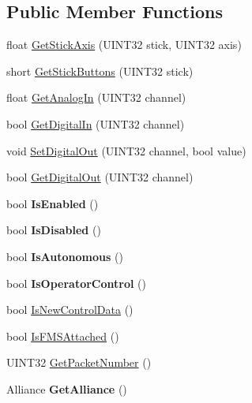 \subsection*{\-Public \-Member \-Functions}
\begin{DoxyCompactItemize}
\item 
float \hyperlink{classDriverStation_ae5e5fbb7b3c287825caee2654971bed3}{\-Get\-Stick\-Axis} (\-U\-I\-N\-T32 stick, \-U\-I\-N\-T32 axis)
\item 
short \hyperlink{classDriverStation_a5a26a64a7f0a1016c24fef2af2514fbb}{\-Get\-Stick\-Buttons} (\-U\-I\-N\-T32 stick)
\item 
float \hyperlink{classDriverStation_abf159102b44e03b26e006a777b96c5e5}{\-Get\-Analog\-In} (\-U\-I\-N\-T32 channel)
\item 
bool \hyperlink{classDriverStation_ac41869035eacd80eb902534afdd944ed}{\-Get\-Digital\-In} (\-U\-I\-N\-T32 channel)
\item 
void \hyperlink{classDriverStation_aa6f189f102414ed3abc4a04aa310bcf3}{\-Set\-Digital\-Out} (\-U\-I\-N\-T32 channel, bool value)
\item 
bool \hyperlink{classDriverStation_a492ef73cb147833e1acdc90188e16f4d}{\-Get\-Digital\-Out} (\-U\-I\-N\-T32 channel)
\item 
\hypertarget{classDriverStation_a7e0490ebe441784f803e09325436ac10}{bool {\bfseries \-Is\-Enabled} ()}\label{classDriverStation_a7e0490ebe441784f803e09325436ac10}

\item 
\hypertarget{classDriverStation_afcccb82207e0342596133e81dc7a047f}{bool {\bfseries \-Is\-Disabled} ()}\label{classDriverStation_afcccb82207e0342596133e81dc7a047f}

\item 
\hypertarget{classDriverStation_ae7f9794664d49a36b65a3cd4a6e6987b}{bool {\bfseries \-Is\-Autonomous} ()}\label{classDriverStation_ae7f9794664d49a36b65a3cd4a6e6987b}

\item 
\hypertarget{classDriverStation_a092c3018d93ff244bea1b6570a48054b}{bool {\bfseries \-Is\-Operator\-Control} ()}\label{classDriverStation_a092c3018d93ff244bea1b6570a48054b}

\item 
bool \hyperlink{classDriverStation_a2315a30b237d80bff26b0d1f81d54648}{\-Is\-New\-Control\-Data} ()
\item 
bool \hyperlink{classDriverStation_a860ba31fcd623fb482c24b8b73700aed}{\-Is\-F\-M\-S\-Attached} ()
\item 
\-U\-I\-N\-T32 \hyperlink{classDriverStation_a103fd8e73107d268cda8a6ecbd324aaa}{\-Get\-Packet\-Number} ()
\item 
\hypertarget{classDriverStation_ab1d20060a7ca1d4d759b729883ce9855}{\-Alliance {\bfseries \-Get\-Alliance} ()}\label{classDriverStation_ab1d20060a7ca1d4d759b729883ce9855}


\end{DoxyCompactItemize}
